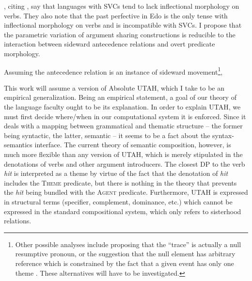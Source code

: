 \documentclass[letterpaper]{article}
\begin{document}
\textcite{bakerstewart1999double}, citing \textcite{dechaine1993diss}, say that languages with SVCs tend to lack inflectional morphology on verbs.
They also note that the past perfective in Edo is the only tense with inflectional morphology on verbs and is incompatible with SVCs.
I propose \parencite[contrary to][]{bakerstewart1999double} that the parametric variation of argument sharing constructions is reducible to the interaction between sideward antecedence relations and overt predicate morphology.

Assuming the antecedence relation is an instance of sideward movement\footnote{
  Other possible analyses include proposing that the ``trace'' is actually a null resumptive pronoun, or the suggestion that the null element has arbitrary reference which is constrained by the fact that a given event has only one theme \parencite{pietroski2005events}.
  These alternatives will have to be investigated.
}, 

This work will assume a version of  Absolute UTAH, which I take to be an empirical generalization.
Being an empirical statement, a goal of our theory of the language faculty ought to be its explanation.
In order to explain UTAH, we must first decide where/when in our computational system it is enforced.
Since it deals with a mapping between grammatical and thematic structure -- the former being syntactic, the latter, semantic -- it seems to be a fact about the syntax-semantics interface.
The current theory of semantic composition, however, is much more flexible than any version of UTAH, which is merely stipulated in the denotations of verbs and other argument introducers.
The closest DP to the verb \textit{hit} is interpreted as a theme by virtue of the fact that the denotation of \textit{hit} includes the \textsc{Theme} predicate, but there is nothing in the theory that prevents the \textit{hit} being bundled with the \textsc{Agent} predicate.
Furthermore, UTAH is expressed in structural terms (specifier, complement, dominance, etc.) which cannot be expressed in the standard compositional system, which only refers to sisterhood relations. 

\printbibliography
\end{document}
